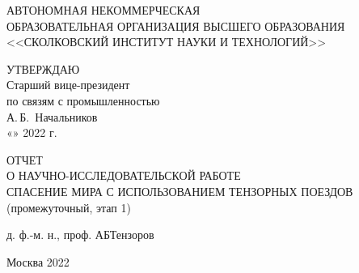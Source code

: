 \begin{titlepage}

\begin{center}
  АВТОНОМНАЯ НЕКОММЕРЧЕСКАЯ\\ОБРАЗОВАТЕЛЬНАЯ ОРГАНИЗАЦИЯ ВЫСШЕГО ОБРАЗОВАНИЯ\\<<СКОЛКОВСКИЙ ИНСТИТУТ НАУКИ И ТЕХНОЛОГИЙ>>
\end{center}

\begin{small}\end{small}

\vspace{0.3cm}

\begin{small}\begin{flushright}
  УТВЕРЖДАЮ
  \\
  Старший вице-президент\\по связям с промышленностью
  \\
  \underline{\hspace{3.cm}}
  А.\,Б.~Начальников
  \\
  «\underline{\hspace{0.7cm}}» \underline{\hspace{2cm}}
  2022 г.
\end{flushright}\end{small}

\vspace{0.4cm}

\begin{center}
  ОТЧЕТ
  \\
  О НАУЧНО-ИССЛЕДОВАТЕЛЬСКОЙ РАБОТЕ
  \\
  \vspace{0.1cm}
  СПАСЕНИЕ МИРА С ИСПОЛЬЗОВАНИЕМ ТЕНЗОРНЫХ ПОЕЗДОВ
  \\
  \vspace{0.1cm}
  (промежуточный, этап 1) %
  \\
\end{center}

\vspace{6cm}

\personmain
  {д. ф.-м. н., проф.}
  {А}{Б}{Тензоров}

\vfill
\begin{center}
	Москва 2022
\end{center}

\end{titlepage}
\setcounter{page}{2}
